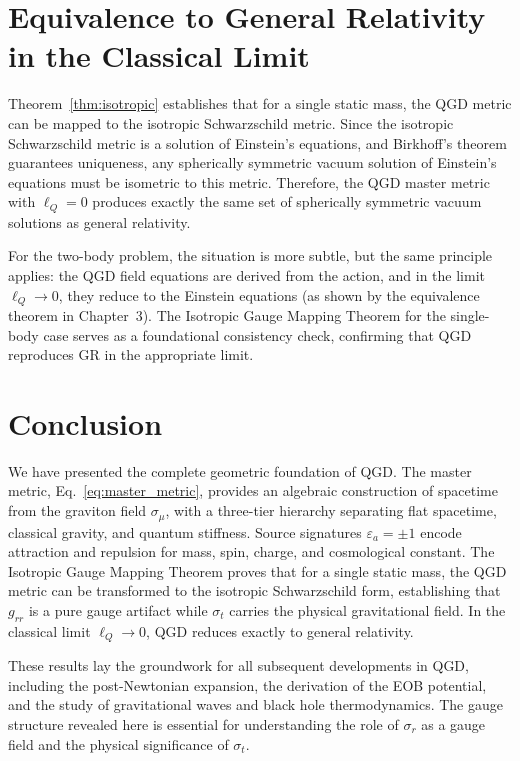 \documentclass[12pt,prd,preprintnumbers,amsmath,amssymb]{revtex4-2}
\theoremstyle{definition}
\theoremstyle{remark}
\begin{document}
\section{Equivalence to General Relativity in the Classical Limit}

Theorem~\ref{thm:isotropic} establishes that for a single static mass, the QGD metric can be mapped to the isotropic Schwarzschild metric. Since the isotropic Schwarzschild metric is a solution of Einstein's equations, and Birkhoff's theorem guarantees uniqueness, any spherically symmetric vacuum solution of Einstein's equations must be isometric to this metric. Therefore, the QGD master metric with $\ell_Q = 0$ produces exactly the same set of spherically symmetric vacuum solutions as general relativity.

For the two-body problem, the situation is more subtle, but the same principle applies: the QGD field equations are derived from the action, and in the limit $\ell_Q \to 0$, they reduce to the Einstein equations (as shown by the equivalence theorem in Chapter~3). The Isotropic Gauge Mapping Theorem for the single-body case serves as a foundational consistency check, confirming that QGD reproduces GR in the appropriate limit.

\section{Conclusion}

We have presented the complete geometric foundation of QGD. The master metric, Eq.~\eqref{eq:master_metric}, provides an algebraic construction of spacetime from the graviton field $\sigma_\mu$, with a three-tier hierarchy separating flat spacetime, classical gravity, and quantum stiffness. Source signatures $\varepsilon_a = \pm 1$ encode attraction and repulsion for mass, spin, charge, and cosmological constant. The Isotropic Gauge Mapping Theorem proves that for a single static mass, the QGD metric can be transformed to the isotropic Schwarzschild form, establishing that $g_{rr}$ is a pure gauge artifact while $\sigma_t$ carries the physical gravitational field. In the classical limit $\ell_Q \to 0$, QGD reduces exactly to general relativity.

These results lay the groundwork for all subsequent developments in QGD, including the post-Newtonian expansion, the derivation of the EOB potential, and the study of gravitational waves and black hole thermodynamics. The gauge structure revealed here is essential for understanding the role of $\sigma_r$ as a gauge field and the physical significance of $\sigma_t$.
\end{document}
